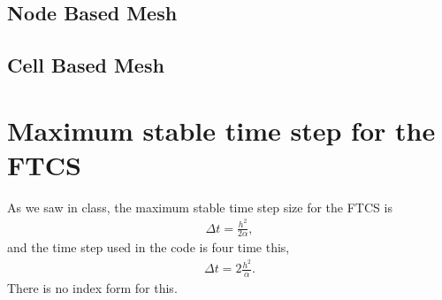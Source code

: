 \subsection*{Node Based Mesh}


\subsection*{Cell Based Mesh}

\section*{Maximum stable time step for the FTCS}
As we saw in class, the maximum stable time step size for the FTCS is
\begin{align*}
\Delta t=\frac{h^2}{2\alpha},
\end{align*}
and the time step used in the code is four time this,
\begin{align*}
\Delta t=2\frac{h^2}{\alpha}.
\end{align*}
There is no index form for this.
